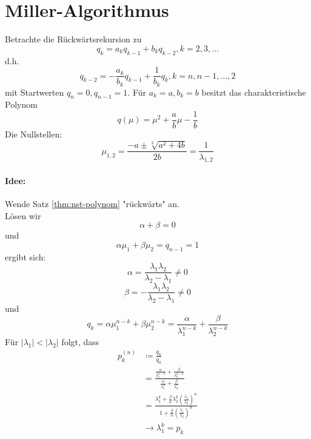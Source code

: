 \section{Miller-Algorithmus}
Betrachte die Rückwärtsrekursion zu
\[
q_k=a_kq_{k-1} + b_k q_{k-2} , k=2,3,\ldots
\]
d.h.
\[
q_{k-2}= -\frac{a_k}{b_k}q_{k-1} + \frac{1}{b_k}q_k , k=n,n-1,\ldots,2
\]
mit Startwerten $q_n=0, q_{n-1}=1$. Für $a_k=a, b_k=b$ besitzt das charakteristische Polynom
\[
q(\mu)=\mu^2+ \frac{a}{b}\mu -\frac{1}{b}
\]
Die Nullstellen:
\[
\mu_{1,2}=\frac{-a\pm\sqrt[2]{a^2+4b}}{2b}=\frac{1}{\lambda_{1,2}}
\]
\paragraph{Idee:} Wende Satz \ref{thm:nst-polynom} "rückwärts" an. \\
Lösen wir
\[
\alpha + \beta = 0
\]
und
\[
\alpha\mu_1+\beta\mu_2=q_{n-1}=1
\]
ergibt sich:
\[
\alpha= \frac{\lambda_1\lambda_2}{\lambda_2-\lambda_1} \neq 0
\]
\[
\beta = -\frac{\lambda_1\lambda_2}{\lambda_2-\lambda_1}\neq 0
\]
und
\[
q_k= \alpha \mu_1^{n-k}+ \beta \mu_2^{n-k}= \frac{\alpha}{\lambda_1^{n-k}}+\frac{\beta}{\lambda_2^{n-k}}
\]
Für $|\lambda_1| < |\lambda_2|$ folgt, dass
\begin{align*}
	p_k^{\left( n \right)}
	&\coloneqq \frac{q_k}{q_0} \\
	&= \frac{\frac{\alpha}{\lambda_1^{n-k}}+\frac{\beta}{\lambda_2^{n-k}}}{\frac{\alpha}{\lambda_1^{n}}+\frac{\beta}{\lambda_2^{n}}} \\
	&=\frac{\lambda_1^{k}+\frac{\beta}{\alpha}\lambda_2^{k}\left( \frac{\lambda_1}{\lambda_2} \right)^{n}}{1+\frac{\beta}{\alpha}\left( \frac{\lambda_1}{\lambda_2} \right)^{n}}\\
	&\to \lambda_1^{k}=p_k
\end{align*}

